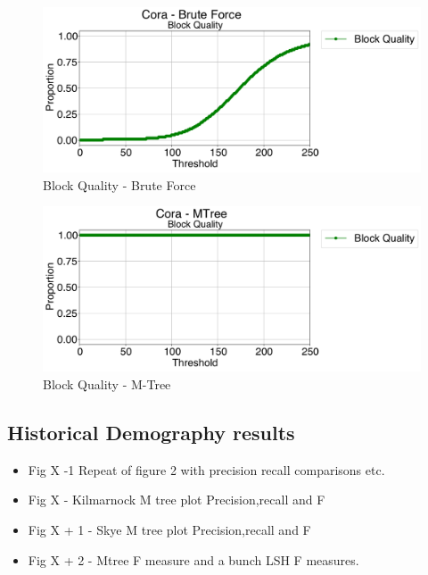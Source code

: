 \documentclass{llncs}
\begin{document}
\begin{figure}
\includegraphics[width=\textwidth]{figures/plotBQ_--_Cora_-_Brute_Force}
\caption{Block Quality - Brute Force\label{cora-block-quality-brute}}
\end{figure}

\begin{figure}
\includegraphics[width=\textwidth]{figures/plotBQ_--_Cora_-_MTree}
\caption{Block Quality - M-Tree\label{cora-block-quality-mtree}}
\end{figure}

\subsection{Historical Demography results}
\begin{itemize}
\item Fig X -1 Repeat of figure 2 with precision recall comparisons etc.
\item Fig X - Kilmarnock M tree plot Precision,recall and F
\item Fig X + 1 - Skye M tree plot Precision,recall and F
\item Fig X + 2 - Mtree F measure and a bunch LSH F measures.
\end{itemize}


\end{document}
